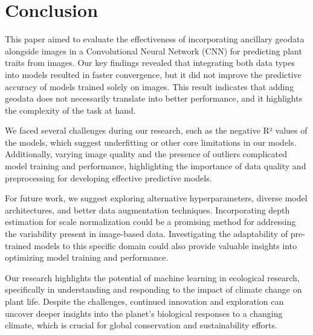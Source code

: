 \documentclass[12pt,a4paper,oneside]{article}
\begin{document}
\newpage
\section{Conclusion}

This paper aimed to evaluate the effectiveness of incorporating ancillary geodata alongside images in a Convolutional Neural Network (CNN) for predicting plant traits from images. Our key findings revealed that integrating both data types into models resulted in faster convergence, but it did not improve the predictive accuracy of models trained solely on images. This result indicates that adding geodata does not necessarily translate into better performance, and it highlights the complexity of the task at hand.

We faced several challenges during our research, such as the negative R² values of the models, which suggest underfitting or other core limitations in our models. Additionally, varying image quality and the presence of outliers complicated model training and performance, highlighting the importance of data quality and preprocessing for developing effective predictive models. 

For future work, we suggest exploring alternative hyperparameters, diverse model architectures, and better data augmentation techniques. Incorporating depth estimation for scale normalization could be a promising method for addressing the variability present in image-based data. Investigating the adaptability of pre-trained models to this specific domain could also provide valuable insights into optimizing model training and performance.

Our research highlights the potential of machine learning in ecological research, specifically in understanding and responding to the impact of climate change on plant life. Despite the challenges, continued innovation and exploration can uncover deeper insights into the planet's biological responses to a changing climate, which is crucial for global conservation and sustainability efforts.

\printbibliography
\end{document}
